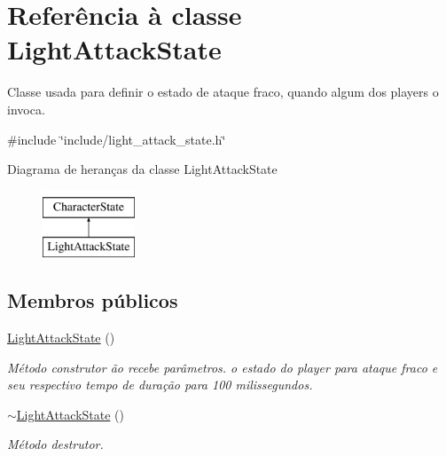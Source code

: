 \hypertarget{classLightAttackState}{}\section{Referência à classe Light\+Attack\+State}
\label{classLightAttackState}


Classe usada para definir o estado de ataque fraco, quando algum dos players o invoca.  




{\ttfamily \#include \char`\"{}include/light\+\_\+attack\+\_\+state.\+h\char`\"{}}

Diagrama de heranças da classe Light\+Attack\+State\begin{figure}[H]
\begin{center}
\leavevmode
\includegraphics[height=2.000000cm]{classLightAttackState}
\end{center}
\end{figure}
\subsection*{Membros públicos}
\begin{DoxyCompactItemize}
\item 
\mbox{\label{classLightAttackState_a26e02205fd7bd5558a568a5e2c8d4de7}} 
\mbox{\hyperlink{classLightAttackState_a26e02205fd7bd5558a568a5e2c8d4de7}{Light\+Attack\+State}} ()
\begin{DoxyCompactList}\small\item\em Método construtor ão recebe parâmetros.  o estado do player para ataque fraco e seu respectivo tempo de duração para 100 milissegundos. \end{DoxyCompactList}\item 
\mbox{\label{classLightAttackState_a2946887dea388dd5e609b2e79d5204c7}} 
\mbox{\hyperlink{classLightAttackState_a2946887dea388dd5e609b2e79d5204c7}{$\sim$\+Light\+Attack\+State}} ()
\begin{DoxyCompactList}\small\item\em Método destrutor. \end{DoxyCompactList}\end{DoxyCompactItemize}
